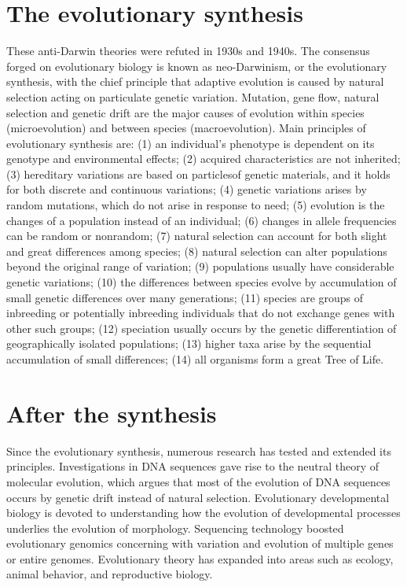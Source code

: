\documentclass[11pt]{article}
\begin{document}
\begin{sloppypar}
\section{The evolutionary synthesis}
These anti-Darwin theories were refuted in 1930s and 1940s. 
The consensus forged on evolutionary biology is known as neo-Darwinism, or the evolutionary synthesis, with the chief principle that adaptive evolution is caused by natural selection acting on particulate genetic variation. 
Mutation, gene flow, natural selection and genetic drift are the major causes of evolution within species (microevolution) and between species (macroevolution). 
Main principles of evolutionary synthesis are: 
(1) an individual's phenotype is dependent on its genotype and environmental effects; 
(2) acquired characteristics are not inherited; 
(3) hereditary variations are based on particlesof genetic materials, and it holds for both discrete and continuous variations; 
(4) genetic variations arises by random mutations, which do not arise in response to need; 
(5) evolution is the changes of a population instead of an individual; 
(6) changes in allele frequencies can be random or nonrandom; 
(7) natural selection can account for both slight and great differences among species; 
(8) natural selection can alter populations beyond the original range of variation; 
(9) populations usually have considerable genetic variations; 
(10) the differences between species evolve by accumulation of small genetic differences over many generations; 
(11) species are groups of inbreeding or potentially inbreeding individuals that do not exchange genes with other such groups; 
(12) speciation usually occurs by the genetic differentiation of geographically isolated populations; 
(13) higher taxa arise by the sequential accumulation of small differences; 
(14) all organisms form a great Tree of Life. 

\section{After the synthesis}
Since the evolutionary synthesis, numerous research has tested and extended its principles. 
Investigations in DNA sequences gave rise to the neutral theory of molecular evolution, which argues that most of the evolution of DNA sequences occurs by genetic drift instead of natural selection. 
Evolutionary developmental biology is devoted to understanding how the evolution of developmental processes underlies the evolution of morphology. 
Sequencing technology boosted evolutionary genomics concerning with variation and evolution of multiple genes or entire genomes. 
Evolutionary theory has expanded into areas such as ecology, animal behavior, and reproductive biology.


  
\end{sloppypar}
\end{document}
